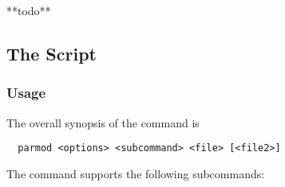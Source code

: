 **todo**



\subsection{The  Script}
\label{impl-all-parmod}

\subsubsection{Usage}

The overall synopsis of the  command is
\begin{verbatim}
  parmod <options> <subcommand> <file> [<file2>]
\end{verbatim}

The  command supports the following subcommands:
